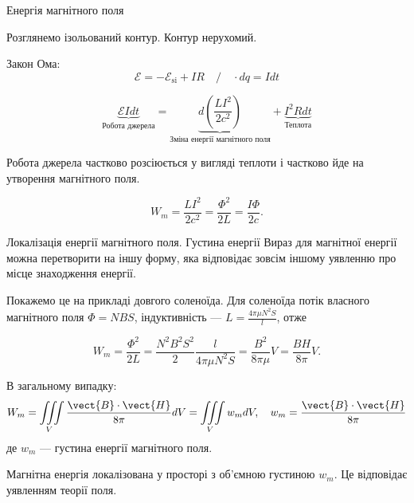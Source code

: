 \documentclass{beamer}
\begin{document}
\begin{frame}{Енергія магнітного поля}{}

	Розглянемо ізольований контур. Контур нерухомий.

	Закон Ома:
	\begin{equation*}
		\mathcal{E} = - \mathcal{E}_\text{si} + IR \quad / \quad \cdot dq = I dt
	\end{equation*}

	\begin{equation*}
		\underbrace{\mathcal{E} I dt}_{\text{Робота джерела}} = \underbrace{d \left(  \frac{LI^2}{2c^2}\right)}_{\text{Зміна енергії магнітного поля}}  + \underbrace{I^2Rdt}_{\text{Теплота}}
	\end{equation*}

	\begin{alertblock}{}
		Робота джерела частково розсіюється у вигляді теплоти і частково йде на утворення магнітного поля.
	\end{alertblock}

	\begin{equation*}
		W_m = \frac{LI^2}{2c^2} = \frac{\Phi^2}{2L} = \frac{I\Phi}{2c}.
	\end{equation*}
\end{frame}





\begin{frame}{Локалізація енергії магнітного поля. Густина енергії}{}
	Вираз для магнітної енергії можна перетворити на іншу форму, яка відповідає
	зовсім іншому уявленню про місце знаходження енергії.


	\bigskip

	{\scriptsize

		Покажемо це на прикладі довгого соленоїда. Для соленоїда потік власного магнітного поля $ \Phi = NBS $, індуктивність --- $ L =  \frac{4\pi\mu N^2 S}{l}$, отже

		\begin{equation*}
			W_m = \frac{\Phi^2}{2L} = \frac{N^2 B^2 S^2}{2} \frac{l}{4\pi\mu N^2 S} = \frac{B^2}{8\pi\mu} V = \frac{BH}{8\pi} V .
		\end{equation*}
	}
	В загальному випадку:
	\begin{equation*}
		W_m = \iiint\limits_V  \frac{\vect{B}\cdot\vect{H}}{8\pi} dV = \iiint\limits_V w_m dV,  \quad w_m = \frac{\vect{B}\cdot\vect{H}}{8\pi}
	\end{equation*}
	де $ w_m $ --- густина енергії магнітного поля.

	\begin{alertblock}{}
		Магнітна енергія локалізована у просторі з об'ємною густиною  $ w_m $. Це відповідає уявленням теорії поля.
	\end{alertblock}
\end{frame}
\end{document}
